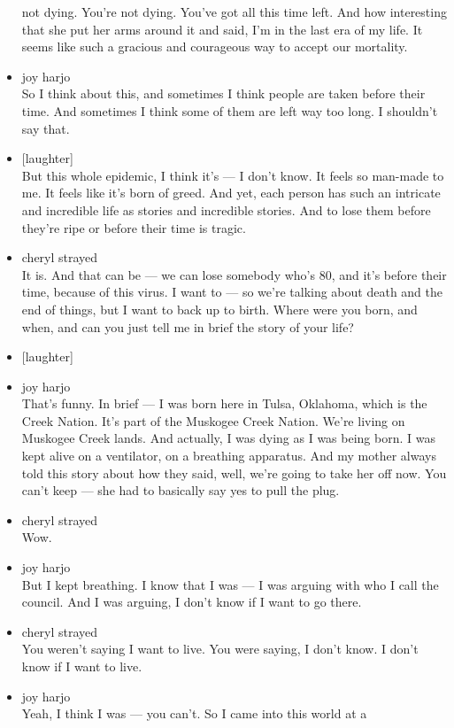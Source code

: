 \begin{itemize}
  not dying. You're not dying. You've got all this time left. And how
  interesting that she put her arms around it and said, I'm in the last
  era of my life. It seems like such a gracious and courageous way to
  accept our mortality.
\item
  joy harjo\\
  So I think about this, and sometimes I think people are taken before
  their time. And sometimes I think some of them are left way too long.
  I shouldn't say that.
\item
  {[}laughter{]}\\
  But this whole epidemic, I think it's --- I don't know. It feels so
  man-made to me. It feels like it's born of greed. And yet, each person
  has such an intricate and incredible life as stories and incredible
  stories. And to lose them before they're ripe or before their time is
  tragic.
\item
  cheryl strayed\\
  It is. And that can be --- we can lose somebody who's 80, and it's
  before their time, because of this virus. I want to --- so we're
  talking about death and the end of things, but I want to back up to
  birth. Where were you born, and when, and can you just tell me in
  brief the story of your life?
\item
  {[}laughter{]}
\item
  joy harjo\\
  That's funny. In brief --- I was born here in Tulsa, Oklahoma, which
  is the Creek Nation. It's part of the Muskogee Creek Nation. We're
  living on Muskogee Creek lands. And actually, I was dying as I was
  being born. I was kept alive on a ventilator, on a breathing
  apparatus. And my mother always told this story about how they said,
  well, we're going to take her off now. You can't keep --- she had to
  basically say yes to pull the plug.
\item
  cheryl strayed\\
  Wow.
\item
  joy harjo\\
  But I kept breathing. I know that I was --- I was arguing with who I
  call the council. And I was arguing, I don't know if I want to go
  there.
\item
  cheryl strayed\\
  You weren't saying I want to live. You were saying, I don't know. I
  don't know if I want to live.
\item
  joy harjo\\
  Yeah, I think I was --- you can't. So I came into this world at a

\end{itemize}
